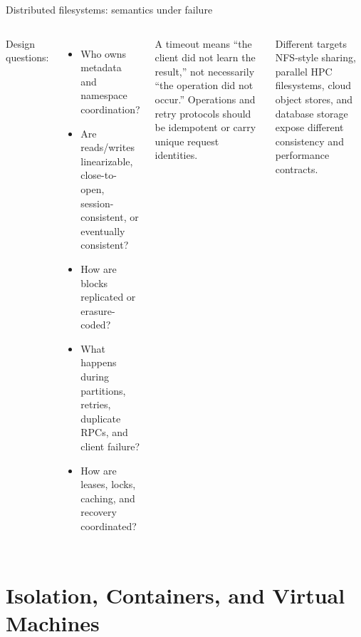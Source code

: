 \documentclass[aspectratio=169,11pt]{beamer}
\begin{document}
\begin{frame}{Distributed filesystems: semantics under failure}
  \begin{columns}[T,onlytextwidth]
      Design questions:
      \begin{itemize}
        \item Who owns metadata and namespace coordination?
        \item Are reads/writes linearizable, close-to-open, session-consistent, or eventually consistent?
        \item How are blocks replicated or erasure-coded?
        \item What happens during partitions, retries, duplicate RPCs, and client failure?
        \item How are leases, locks, caching, and recovery coordinated?
      \end{itemize}
      \begin{tcolorbox}[title=Failure-aware API]
        A timeout means ``the client did not learn the result,'' not necessarily ``the operation did not occur.'' Operations and retry protocols should be idempotent or carry unique request identities.
      \end{tcolorbox}
      \begin{block}{Different targets}
        NFS-style sharing, parallel HPC filesystems, cloud object stores, and database storage expose different consistency and performance contracts.
      \end{block}
  \end{columns}
\end{frame}

\section{Isolation, Containers, and Virtual Machines}
\end{document}
